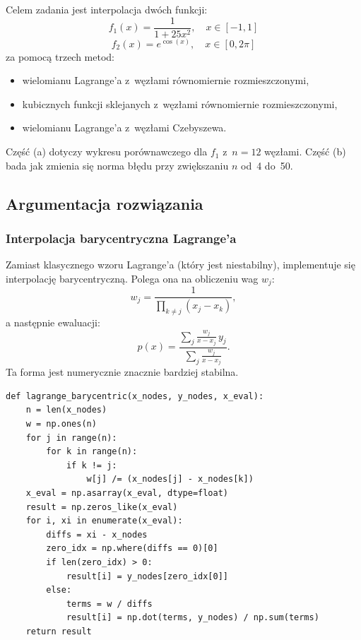 \documentclass[12pt, a4paper]{article}
\begin{document}
Celem zadania jest interpolacja dwóch funkcji:
\[
  f_1(x) = \frac{1}{1 + 25x^2}, \quad x \in [-1, 1]
\]
\[
  f_2(x) = e^{\cos(x)}, \quad x \in [0, 2\pi]
\]
za pomocą trzech metod:
\begin{itemize}
  \item wielomianu Lagrange'a z~węzłami równomiernie rozmieszczonymi,
  \item kubicznych funkcji sklejanych z~węzłami równomiernie rozmieszczonymi,
  \item wielomianu Lagrange'a z~węzłami Czebyszewa.
\end{itemize}

Część (a) dotyczy wykresu porównawczego dla $f_1$ z~$n = 12$ węzłami.
Część (b) bada jak zmienia się norma błędu przy zwiększaniu $n$ od~4
do~50.

\subsection{Argumentacja rozwiązania}

\subsubsection{Interpolacja barycentryczna Lagrange'a}

Zamiast klasycznego wzoru Lagrange'a (który jest niestabilny), implementuje
się interpolację barycentryczną. Polega ona na obliczeniu wag $w_j$:
\[
  w_j = \frac{1}{\displaystyle\prod_{k \neq j}(x_j - x_k)},
\]
a następnie ewaluacji:
\[
  p(x) = \frac{\displaystyle\sum_j \frac{w_j}{x - x_j}\, y_j}
              {\displaystyle\sum_j \frac{w_j}{x - x_j}}.
\]
Ta forma jest numerycznie znacznie bardziej stabilna.
\newpage
\begin{lstlisting}[caption={Interpolacja barycentryczna Lagrange'a}]
def lagrange_barycentric(x_nodes, y_nodes, x_eval):
    n = len(x_nodes)
    w = np.ones(n)
    for j in range(n):
        for k in range(n):
            if k != j:
                w[j] /= (x_nodes[j] - x_nodes[k])
    x_eval = np.asarray(x_eval, dtype=float)
    result = np.zeros_like(x_eval)
    for i, xi in enumerate(x_eval):
        diffs = xi - x_nodes
        zero_idx = np.where(diffs == 0)[0]
        if len(zero_idx) > 0:
            result[i] = y_nodes[zero_idx[0]]
        else:
            terms = w / diffs
            result[i] = np.dot(terms, y_nodes) / np.sum(terms)
    return result
\end{lstlisting}
\end{document}
